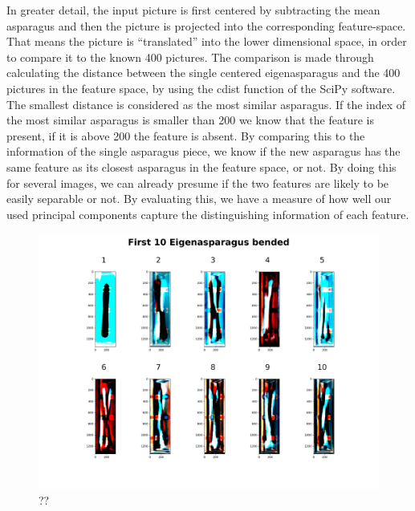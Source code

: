In greater detail, the input picture is first centered by subtracting the mean asparagus and then the picture is projected into the corresponding feature-space. That means the picture is “translated” into the lower dimensional space, in order to compare it to the known 400 pictures. The comparison is made through calculating the distance between the single centered eigenasparagus and the 400 pictures in the feature space, by using the cdist function of the SciPy software. The smallest distance is considered as the most similar asparagus. If the index of the most similar asparagus is smaller than 200 we know that the feature is present, if it is above 200 the feature is absent. By comparing this to the information of the single asparagus piece, we know if the new asparagus has the same feature as its closest asparagus in the feature space, or not. By doing this for several images, we can already presume if the two features are likely to be easily separable or not. By evaluating this, we have a measure of how well our used principal components capture the distinguishing information of each feature.\\


\begin{figure}[H]
	\centering
	\includegraphics[scale=0.09]{Figures/chapter04/pc_bended}
	\decoRule
	\caption[??]{??}
	\label{fig:PrincipalComponentBended}
\end{figure}



